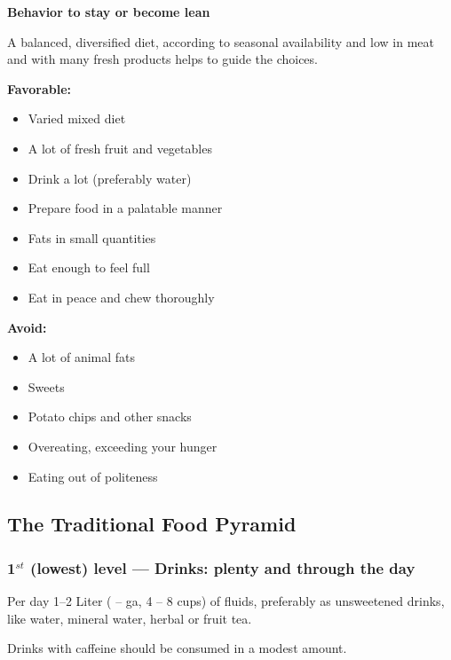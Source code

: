 \documentclass[../main.tex]{subfiles}
\begin{document}
\vspace{5mm}
\noindent
\begin{fminipage}{\textwidth}
  \textbf{Behavior to stay or become lean}
  
  A balanced, diversified diet, according to seasonal availability and low in meat and with many fresh products helps to guide the choices.

  \textbf{Favorable:}
  \begin{itemize}[noitemsep,nolistsep]
  \item Varied mixed diet
  \item A lot of fresh fruit and vegetables
  \item Drink a lot (preferably water)
  \item Prepare food in a palatable manner
  \item Fats in small quantities
  \item Eat enough to feel full
  \item Eat in peace and chew thoroughly   
  \end{itemize}
  
  \textbf{Avoid:}
  \begin{itemize}[noitemsep,nolistsep]
  \item A lot of animal fats
  \item Sweets
  \item Potato chips and other snacks
  \item Overeating, exceeding your hunger
    \item Eating out of politeness
  \end{itemize}
  
\end{fminipage}

\subsection{The Traditional Food Pyramid}

\subsubsection{1$^{st}$ (lowest) level --- Drinks: plenty and through the day}

Per day 1--2 Liter ( --  ga, 4 -- 8 cups) of fluids, preferably as unsweetened drinks, like water, mineral water, herbal or fruit tea.

\noindent Drinks with caffeine should be consumed in a modest amount.
\end{document}
